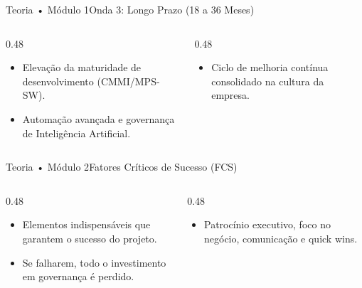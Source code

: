 \begin{senaiframe}{Teoria • Módulo 1}{Onda 3: Longo Prazo (18 a 36 Meses)}
  \begin{columns}[t]
    \begin{column}{0.48\textwidth}
      \begin{tcolorbox}[senaigreencard, title={Otimização Avançada}]
        \begin{itemize}
          \item Elevação da maturidade de desenvolvimento (CMMI/MPS-SW).
          \item Automação avançada e governança de Inteligência Artificial.
        \end{itemize}
      \end{tcolorbox}
    \end{column}
    \begin{column}{0.48\textwidth}
      \begin{tcolorbox}[senaibluecard, title={Governança Contínua}]
        \begin{itemize}
          \item Ciclo de melhoria contínua consolidado na cultura da empresa.
        \end{itemize}
      \end{tcolorbox}
    \end{column}
  \end{columns}
\end{senaiframe}

\begin{senaiframe}{Teoria • Módulo 2}{Fatores Críticos de Sucesso (FCS)}
  \begin{columns}[t]
    \begin{column}{0.48\textwidth}
      \begin{tcolorbox}[senaibluecard, title={O que são FCS?}]
        \begin{itemize}
          \item Elementos indispensáveis que garantem o sucesso do projeto.
          \item Se falharem, todo o investimento em governança é perdido.
        \end{itemize}
      \end{tcolorbox}
    \end{column}
    \begin{column}{0.48\textwidth}
      \begin{tcolorbox}[senaicard, title={Principais FCS}]
        \begin{itemize}
          \item Patrocínio executivo, foco no negócio, comunicação e quick wins.
        \end{itemize}
      \end{tcolorbox}
    \end{column}
  \end{columns}
\end{senaiframe}

